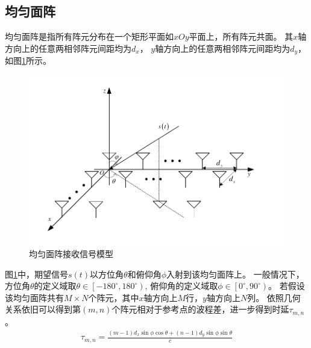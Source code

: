 \documentclass[master]{thesis-uestc}
\begin{document}
\subsection{均匀面阵}
均匀面阵是指所有阵元分布在一个矩形平面如$xOy$平面上，所有阵元共面。
其$x$轴方向上的任意两相邻阵元间距均为$d_x$，
$y$轴方向上的任意两相邻阵元间距均为$d_y$，如图\ref{URA}所示。
\begin{figure}[h]
\includegraphics[scale=0.8]{pic/URA.pdf}
\caption{均匀面阵接收信号模型}
\label{URA}
\end{figure}

图\ref{URA}中，期望信号$s(t)$以方位角$\theta$和俯仰角$\phi$入射到该均匀面阵上。
一般情况下，方位角$\theta$的定义域取$\theta\in\left[-180^\circ,180^\circ\right)$,
俯仰角的定义域取$\phi\in\left[0^\circ,90^\circ\right)$。
若假设该均匀面阵共有$M \times N$个阵元，其中$x$轴方向上$M$行，$y$轴方向上$N$列。
依照几何关系依旧可以得到第$(m,n)$个阵元相对于参考点的波程差，进一步得到时延$\tau_{m,n}$。
\begin{equation}\label{URA_time_delay}
    \begin{aligned}
        \tau_{m,n} = 
        \frac{(m-1)d_x\sin\phi\cos\theta + (n-1)d_y\sin\phi\sin\theta}{c}
    \end{aligned}
\end{equation}
\end{document}
